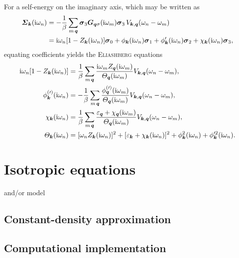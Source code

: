 For a self-energy on the imaginary axis, which may be written as
%
\begin{align*}
    \boldsymbol {\varSigma}_{\boldsymbol k}(\mathrm i \omega_n) &= -\frac 1 \beta \sum_{m \, \boldsymbol q}
    \boldsymbol \sigma_3 \boldsymbol G_{\boldsymbol q \sigma}(\mathrm i \omega_m) \boldsymbol \sigma_3 \,
    V_{\boldsymbol k, \boldsymbol q}(\omega_n - \omega_m)
    \\
    &= \mathrm i \omega_n [1 - Z_{\boldsymbol k}(\mathrm i \omega_n)] \boldsymbol \sigma_0
    + \phi_{\boldsymbol k}(\mathrm i \omega_n) \boldsymbol \sigma_1
    + \phi'_{\boldsymbol k}(\mathrm i \omega_n) \boldsymbol \sigma_2
    + \chi_{\boldsymbol k}(\mathrm i \omega_n) \boldsymbol \sigma_3,
\end{align*}
%
equating coefficients yields the \textsc{Eliashberg} equations
%
\begin{align} \label{Eliashberg equations}
    \begin{split}
        \mathrm i \omega_n [1 - Z_{\boldsymbol k}(\mathrm i \omega_n)] &=
        \frac 1 \beta \sum_{m \, \boldsymbol q}
        \frac
            {\mathrm i \omega_m Z_{\boldsymbol q}(\mathrm i \omega_m)}
            {\varTheta_{\boldsymbol q}(\mathrm i \omega_m)}
        V_{\boldsymbol k, \boldsymbol q}(\omega_n - \omega_m),
        \\
        \phi^{(\prime)}_{\boldsymbol k}(\mathrm i \omega_n) &=
        -\frac 1 \beta \sum_{m \, \boldsymbol q}
        \frac
            {\phi^{(\prime)}_{\boldsymbol q}(\mathrm i \omega_m)}
            {\varTheta_{\boldsymbol q}(\mathrm i \omega_m)}
        V_{\boldsymbol k, \boldsymbol q}(\omega_n - \omega_m),
        \\
        \chi_{\boldsymbol k}(\mathrm i \omega_n) &=
        \frac 1 \beta \sum_{m \, \boldsymbol q}
        \frac
            {\varepsilon_{\boldsymbol q} + \chi_{\boldsymbol q}(\mathrm i \omega_m)}
            {\varTheta_{\boldsymbol q}(\mathrm i \omega_m)}
        V_{\boldsymbol k, \boldsymbol q}(\omega_n - \omega_m),
        \\
        \varTheta_{\boldsymbol k}(\mathrm i \omega_n) &=
        [\omega_n Z_{\boldsymbol k}(\mathrm i \omega_n)]^2
        + [\varepsilon_{\boldsymbol k} + \chi_{\boldsymbol k}(\mathrm i \omega_n)]^2
        + \phi_{\boldsymbol k}^2(\mathrm i \omega_n)
        + \phi'^2_{\boldsymbol k}(\mathrm i \omega_n).
    \end{split}
\end{align}

\section{Isotropic equations}

 and/or  model

\subsection{Constant-density approximation}

\subsection{Computational implementation}
